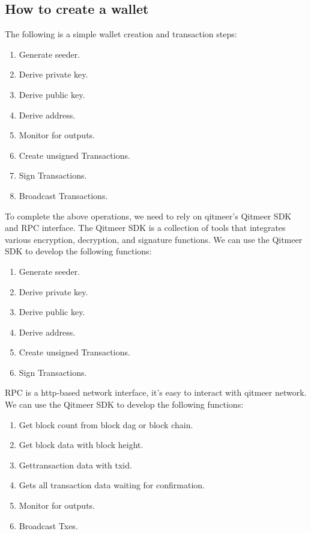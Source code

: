 \documentclass[a4paper,11pt]{article}
\begin{document}
\subsection*{How to create a wallet}
   The following is a simple wallet creation and transaction steps:
\begin{enumerate}
	\item  Generate seeder.
    \item  Derive private key.
    \item  Derive public key.
    \item  Derive address.
    \item  Monitor for outputs.
    \item  Create unsigned Transactions.
    \item  Sign Transactions.
    \item  Broadcast Transactions.
\end{enumerate}

   To complete the above operations, we need to rely on qitmeer's Qitmeer SDK and RPC interface.
   The Qitmeer SDK is a collection of tools that integrates various encryption, decryption, and signature functions. We can use the Qitmeer SDK to develop the following functions:

   \begin{enumerate}
     \item Generate seeder.
     \item Derive private key.
     \item Derive public key.
     \item Derive address.
     \item Create unsigned Transactions.
	 \item Sign Transactions.
   \end{enumerate}

   RPC is a http-based network interface, it’s easy to interact with qitmeer network. We can use the Qitmeer SDK to develop the following functions:

   \begin{enumerate}
    \item  Get block count from block dag or block chain.
    \item Get block data with block height.
    \item  Gettransaction data with txid.
    \item  Gets all transaction data waiting for confirmation.
    \item  Monitor for outputs.
    \item  Broadcast Txes.
   \end{enumerate}
\end{document}
